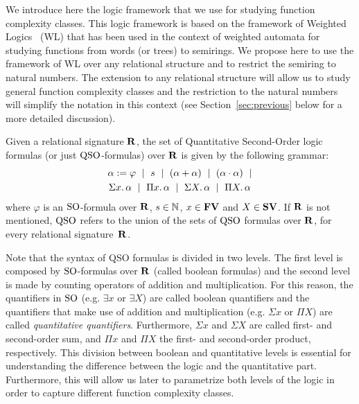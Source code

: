 
We introduce here the logic framework that we use for studying function complexity classes. 
This logic framework is based on the framework of Weighted Logics~\cite{DrosteG07} (WL) that has been used in the context of weighted automata for studying functions from words (or trees) to semirings. 
We propose here to use the framework of WL over any relational structure and to restrict the semiring to natural numbers. 
The extension to any relational structure will allow us to study general function complexity classes and the restriction to the natural numbers will simplify the notation in this context (see Section~\ref{sec:previous} below for a more detailed discussion).

Given a relational signature $\mathbf{R}$, the set of Quantitative Second-Order logic formulas (or just ${\rm QSO}$-formulas) over $\mathbf{R}$ is given by the following grammar:
\begin{multline}
\alpha := \varphi \ \mid \ s \ \mid \ (\alpha \add \alpha) \ \mid\ (\alpha \mult \alpha) \ \mid \\ \sa{x} \alpha \ \mid \ \pa{x} \alpha \ \mid \ \sa{X} \alpha \ \mid \ \pa{X} \alpha \label{syntax} 
\end{multline}
where $\varphi$ is an ${\rm SO}$-formula over $\mathbf{R}$, $s \in \mathbb{N}$, $x \in \mathbf{FV}$ and $X \in \mathbf{SV}$. If $\mathbf{R}$ is not mentioned, ${\rm QSO}$ refers to the union of the sets of ${\rm QSO}$ formulas over $\mathbf{R}$, for every relational signature~$\mathbf{R}$.
 
Note that the syntax of QSO formulas is divided in two levels. 
The first level is composed by ${\rm SO}$-formulas over $\mathbf{R}$ (called boolean formulas) and the second level is made by counting operators of addition and multiplication. 
For this reason, the quantifiers in ${\rm SO}$ (e.g. $\exists x$ or $\exists X$) are called boolean quantifiers and the quantifiers that make use of addition and multiplication (e.g. $\Sigma x$ or $\Pi X$) are called {\em quantitative quantifiers}.
Furthermore, $\Sigma x$ and $\Sigma X$ are called first- and second-order sum, and $\Pi x$ and $\Pi X$ the first- and second-order product, respectively.
This division between boolean and quantitative levels is essential for understanding the difference between the logic and the quantitative part. 
Furthermore, this will allow us later to parametrize both levels of the logic in order to capture different function complexity classes.


